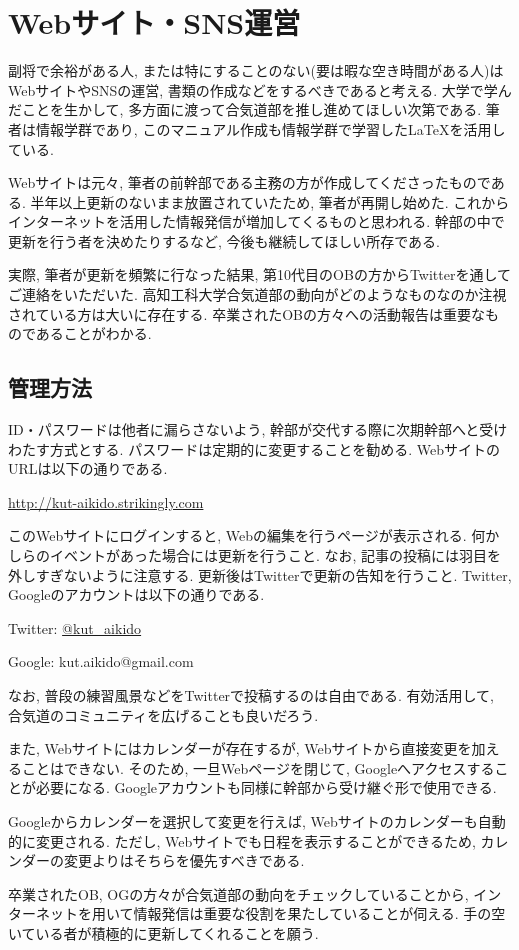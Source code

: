 \documentclass[a4j,titlepage]{jarticle}
\begin{document}
\section{Webサイト・SNS運営}
副将で余裕がある人, または特にすることのない(要は暇な空き時間がある人)はWebサイトやSNSの運営, 書類の作成などをするべきであると考える. 大学で学んだことを生かして, 多方面に渡って合気道部を推し進めてほしい次第である. 筆者は情報学群であり, このマニュアル作成も情報学群で学習した\LaTeX を活用している. \par
Webサイトは元々, 筆者の前幹部である主務の方が作成してくださったものである. 半年以上更新のないまま放置されていたため, 筆者が再開し始めた. これからインターネットを活用した情報発信が増加してくるものと思われる. 幹部の中で更新を行う者を決めたりするなど, 今後も継続してほしい所存である. \par
実際, 筆者が更新を頻繁に行なった結果, 第10代目のOBの方からTwitterを通してご連絡をいただいた. 高知工科大学合気道部の動向がどのようなものなのか注視されている方は大いに存在する. 卒業されたOBの方々への活動報告は重要なものであることがわかる.

\subsection{管理方法}
ID・パスワードは他者に漏らさないよう, 幹部が交代する際に次期幹部へと受けわたす方式とする. パスワードは定期的に変更することを勧める. WebサイトのURLは以下の通りである.

\vspace{5mm}
\href{http://kut-aikido.strikingly.com}{http://kut-aikido.strikingly.com}
\vspace{5mm}

このWebサイトにログインすると, Webの編集を行うページが表示される. 何かしらのイベントがあった場合には更新を行うこと. なお, 記事の投稿には羽目を外しすぎないように注意する. 更新後はTwitterで更新の告知を行うこと. Twitter, Googleのアカウントは以下の通りである. \par

\vspace{5mm}
Twitter: \href{http://twitter.com/kut\_aikido}{@kut\_aikido} \par
Google: kut.aikido@gmail.com \par
\vspace{5mm}

なお, 普段の練習風景などをTwitterで投稿するのは自由である. 有効活用して, 合気道のコミュニティを広げることも良いだろう. \par
また, Webサイトにはカレンダーが存在するが, Webサイトから直接変更を加えることはできない. そのため, 一旦Webページを閉じて, Googleへアクセスすることが必要になる. Googleアカウントも同様に幹部から受け継ぐ形で使用できる. \par
Googleからカレンダーを選択して変更を行えば, Webサイトのカレンダーも自動的に変更される. ただし, Webサイトでも日程を表示することができるため, カレンダーの変更よりはそちらを優先すべきである. \par
卒業されたOB, OGの方々が合気道部の動向をチェックしていることから, インターネットを用いて情報発信は重要な役割を果たしていることが伺える. 手の空いている者が積極的に更新してくれることを願う. 
\end{document}
